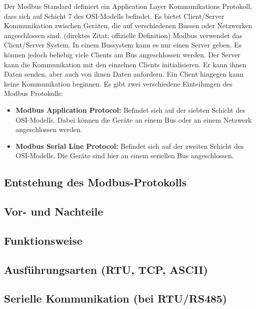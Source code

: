 Der Modbus Standard definiert ein Application Layer Kommunikations Protokoll, dass sich auf Schicht 7 des OSI-Modells befindet. Es bietet Client/Server Kommunikation zwischen Geräten, die auf verschiedenen Bussen oder Netzwerken angeschlossen sind. (direktes Zitat; offizielle Definition)
Modbus verwendet das Client/Server System. In einem Bussystem kann es nur einen Server geben. Es können jedoch beliebig viele Clients am Bus angeschlossen werden. Der Server kann die Kommunikation mit den einzelnen Clients initialisieren. Er kann ihnen Daten senden, aber auch von ihnen Daten anfordern. Ein Client hingegen kann keine Kommunikation beginnen.
Es gibt zwei verschiedene Einteilungen des Modbus Protokolls: 
\begin{itemize}
\item \textbf{Modbus Application Protocol:} Befindet sich auf der siebten Schicht des OSI-Modells. Dabei können die Geräte an einem Bus oder an einem Netzwerk angeschlossen werden.
\item \textbf{Modbus Serial Line Protocol:} Befindet sich auf der zweiten Schicht des OSI-Modells. Die Geräte sind hier an einem seriellen Bus angeschlossen.
\end{itemize}
\cite{Modbus_Organization_AP:2012}
\cite{Modbus_Organization_SL:2012}

\subsection{Entstehung des Modbus-Protokolls}

\subsection{Vor- und Nachteile}


\subsection{Funktionsweise}


\subsection{Ausführungsarten (RTU, TCP, ASCII)}


\subsection{Serielle Kommunikation (bei RTU/RS485)}


